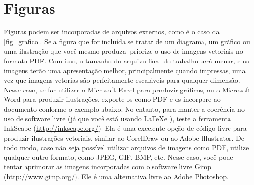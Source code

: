 \documentclass[
	12pt,				%
	openright,			%
	oneside,			    %
	a4paper,				%
	english,			%
	french,			%
	spanish,			%
	brazil			%
	]{abntex2}
\begin{document}
\begin{table}[htb]
\end{table}


\section{Figuras}

Figuras podem ser incorporadas de arquivos externos, como é o caso da
\autoref{fig_grafico}. Se a figura que for incluída se tratar de um diagrama, um
gráfico ou uma ilustração que você mesmo produza, priorize o uso de imagens
vetoriais no formato PDF. Com isso, o tamanho do arquivo final do trabalho será
menor, e as imagens terão uma apresentação melhor, principalmente quando
impressas, uma vez que imagens vetorias são perfeitamente escaláveis para
qualquer dimensão. Nesse caso, se for utilizar o Microsoft Excel para produzir
gráficos, ou o Microsoft Word para produzir ilustrações, exporte-os como PDF e
os incorpore ao documento conforme o exemplo abaixo. No entanto, para manter a
coerência no uso de software livre (já que você está usando \LaTeX e \abnTeX),
teste a ferramenta \textsf{InkScape}
(\url{http://inkscape.org/}). Ela é uma excelente opção de código-livre para
produzir ilustrações vetoriais, similar ao CorelDraw ou ao Adobe
Illustrator. De todo modo, caso não seja possível
utilizar arquivos de imagens como PDF, utilize qualquer outro formato, como
JPEG, GIF, BMP, etc. Nesse caso, você pode tentar aprimorar as imagens
incorporadas com o software livre \textsf{Gimp}
(\url{http://www.gimp.org/}). Ele é uma alternativa livre ao Adobe
Photoshop.
\end{document}
